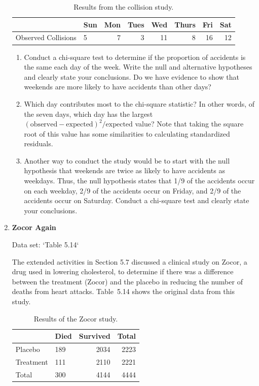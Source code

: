 \documentclass[
]{book}
\begin{document}
\begin{enumerate}
\begin{table}[!h]
\centering
\caption{\label{tab:tab13} Results from the collision study.}
\centering
\begin{tabular}[t]{llrrrrrr}
\toprule
  & Sun & Mon & Tues & Wed & Thurs & Fri & Sat\\
\midrule
Observed Collisions & 5 & 7 & 3 & 11 & 8 & 16 & 12\\
\bottomrule
\end{tabular}
\end{table}
  \begin{enumerate}
    \item Conduct a chi-square test to determine if the proportion of accidents is the same each day of the week. Write the null and alternative hypotheses and clearly state your conclusions. Do we have evidence to show that weekends are more likely to have accidents than other days?
    \item Which day contributes most to the chi-square statistic? In other words, of the seven days, which day has the largest \((\text{observed} - \text{expected})^2/\text{expected}\) value? Note that taking the square root of
this value has some similarities to calculating standardized residuals.
    \item Another way to conduct the study would be to start with the null hypothesis that weekends are twice as likely to have accidents as weekdays. Thus, the null hypothesis states that 1/9 of the accidents occur on each weekday, 2/9 of the accidents occur on Friday, and 2/9 of the accidents occur on Saturday. Conduct a chi-square test and clearly state your conclusions.
  \end{enumerate}

  \item \textbf{Zocor Again}    

  Data set: `Table 5.14`    
  
  The extended activities in Section 5.7 discussed a clinical study on Zocor, a drug used in lowering cholesterol, to determine if there was a difference between the treatment (Zocor) and the placebo in reducing the number of deaths from heart attacks. Table 5.14 shows the original data from this study.  
  
\begin{table}[!h]
\centering
\caption{\label{tab:tab14} Results of the Zocor study.}
\centering
\begin{tabular}[t]{llrr}
\toprule
  & Died & Survived & Total\\
\midrule
Placebo & 189 & 2034 & 2223\\
Treatment & 111 & 2110 & 2221\\
Total & 300 & 4144 & 4444\\
\bottomrule
\end{tabular}
\end{table}
  

\end{enumerate}
\end{document}
